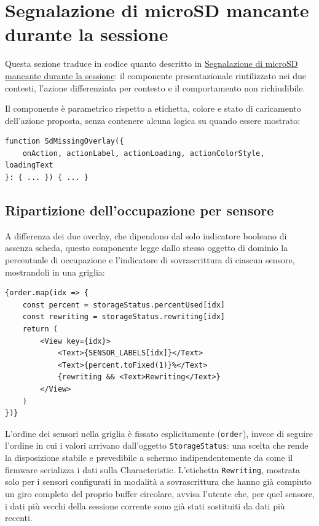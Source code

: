 \newpage

\section{Segnalazione di microSD mancante durante la sessione}

Questa sezione traduce in codice quanto descritto in
\hyperref[sec:app-sdmissing]{Segnalazione di microSD mancante durante la
sessione}: il componente presentazionale riutilizzato nei due contesti,
l'azione differenziata per contesto e il comportamento non richiudibile.

Il componente è parametrico rispetto a etichetta, colore e stato di
caricamento dell'azione proposta, senza contenere alcuna logica su quando
essere mostrato:

\begin{listing}[H]
\begin{verbatim}
function SdMissingOverlay({
    onAction, actionLabel, actionLoading, actionColorStyle, loadingText
}: { ... }) { ... }
\end{verbatim}
\caption{Firma del componente presentazionale di segnalazione SD mancante}
\label{listing:sdmissing-props}
\end{listing}

\subsection{Ripartizione dell'occupazione per sensore}
A differenza dei due overlay, che dipendono dal solo indicatore booleano di assenza scheda, questo componente legge dallo stesso oggetto di
dominio la percentuale di occupazione e l'indicatore di sovrascrittura di ciascun sensore, mostrandoli in una griglia:

\begin{listing}[H]
\begin{verbatim}
{order.map(idx => {
    const percent = storageStatus.percentUsed[idx]
    const rewriting = storageStatus.rewriting[idx]
    return (
        <View key={idx}>
            <Text>{SENSOR_LABELS[idx]}</Text>
            <Text>{percent.toFixed(1)}%</Text>
            {rewriting && <Text>Rewriting</Text>}
        </View>
    )
})}
\end{verbatim}
\caption{Ripartizione per sensore della percentuale di occupazione}
\label{listing:storage-usage-card}
\end{listing}

L'ordine dei sensori nella griglia è fissato esplicitamente (\texttt{order}), invece di seguire l'ordine in cui i valori arrivano
dall'oggetto \texttt{StorageStatus}: una scelta che rende la disposizione stabile e prevedibile a schermo indipendentemente da come il
firmware serializza i dati sulla Characteristic. L'etichetta \texttt{Rewriting}, mostrata solo per i sensori configurati in modalità a
sovrascrittura che hanno già compiuto un giro completo del proprio buffer circolare, avvisa l'utente che, per quel sensore, i dati più vecchi
della sessione corrente sono già stati sostituiti da dati più recenti.

